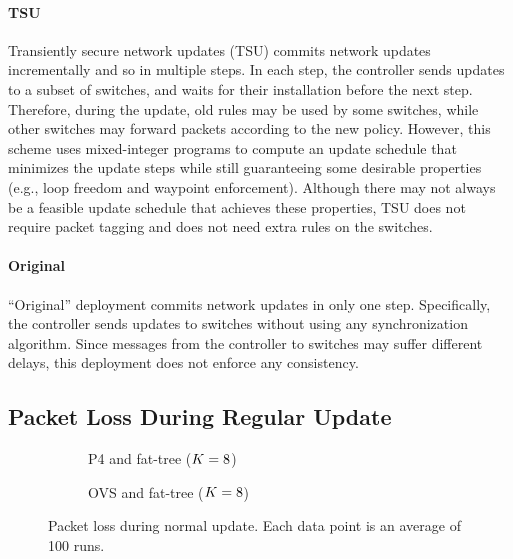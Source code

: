 \paragraph{TSU}

Transiently secure network updates (TSU) commits network updates
incrementally and so in multiple steps. In each step, the controller
sends updates to a subset of switches, and waits for their
installation before the next step.  Therefore, during the update, old
rules may be used by some switches, while other switches may forward
packets according to the new policy.  However, this scheme uses
mixed-integer programs to compute an update schedule that minimizes
the update steps while still guaranteeing some desirable properties
(e.g., loop freedom and waypoint enforcement).  Although there may not
always be a feasible update schedule that achieves these properties,
TSU does not require packet tagging and does not need extra rules on
the switches.

\paragraph{Original}

``Original'' deployment commits network updates in only one
step. Specifically, the controller sends updates to switches without
using any synchronization algorithm. Since messages from the
controller to switches may suffer different delays, this deployment
does not enforce any consistency.

\subsection{Packet Loss During Regular Update}
\label{sec:eval:packet-loss}

\begin{figure}[b]
\centering
  \begin{subfigure}[b]{0.49\linewidth}
    \resizebox{\linewidth}{!}{}
    \caption{P4 and fat-tree ($K=8$)}
    \label{fig:normal_update:p4}
  \end{subfigure}
    \begin{subfigure}[b]{0.49\linewidth}
    \resizebox{\linewidth}{!}{}
    \caption{OVS and fat-tree ($K=8$)}
    \label{fig:normal_update:openvswitch}
  \end{subfigure}
\caption{Packet loss during normal update.  Each data point is an
average of 100 runs.}
\label{fig:normal_update}
\end{figure}

